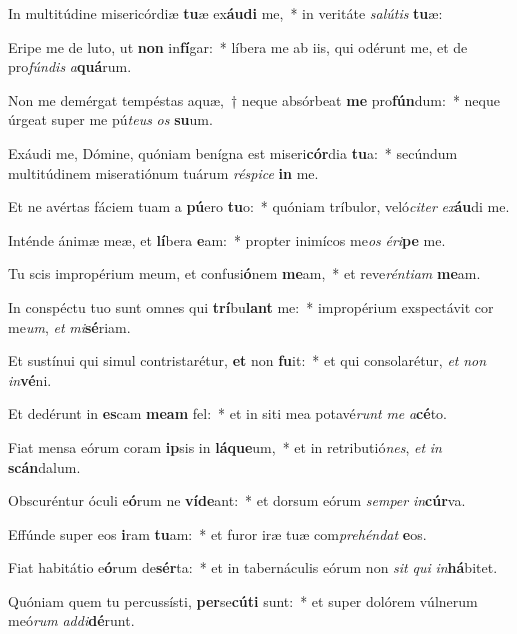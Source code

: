 \item In multitúdine misericórdiæ \textbf{tu}æ ex\textbf{áu}\textbf{di} me,~* in veritáte \textit{sa}\textit{lú}\textit{tis} \textbf{tu}æ:
\item Eripe me de luto, ut \textbf{non} in\textbf{fí}gar:~* líbera me ab iis, qui odérunt me, et de pro\textit{fún}\textit{dis} \textit{a}\textbf{quá}rum.
\item Non me demérgat tempéstas aquæ,~† neque absórbeat \textbf{me} pro\textbf{fún}dum:~* neque úrgeat super me pú\textit{te}\textit{us} \textit{os} \textbf{su}um.
\item Exáudi me, Dómine, quóniam benígna est miseri\textbf{cór}dia \textbf{tu}a:~* secúndum multitúdinem miseratiónum tuárum \textit{ré}\textit{spi}\textit{ce} \textbf{in} me.
\item Et ne avértas fáciem tuam a \textbf{pú}ero \textbf{tu}o:~* quóniam tríbulor, veló\textit{ci}\textit{ter} \textit{ex}\textbf{áu}di me.
\item Inténde ánimæ meæ, et \textbf{lí}bera \textbf{e}am:~* propter inimícos me\textit{os} \textit{é}\textit{ri}\textbf{pe} me.
\item Tu scis impropérium meum, et confusi\textbf{ó}nem \textbf{me}am,~* et reve\textit{rén}\textit{ti}\textit{am} \textbf{me}am.
\item In conspéctu tuo sunt omnes qui \textbf{trí}bu\textbf{lant} me:~* impropérium exspectávit cor me\textit{um}, \textit{et} \textit{mi}\textbf{sé}riam.
\item Et sustínui qui simul contristarétur, \textbf{et} non \textbf{fu}it:~* et qui consolarétur, \textit{et} \textit{non} \textit{in}\textbf{vé}ni.
\item Et dedérunt in \textbf{es}cam \textbf{me}\textbf{am} fel:~* et in siti mea potavé\textit{runt} \textit{me} \textit{a}\textbf{cé}to.
\item Fiat mensa eórum coram \textbf{ip}sis in \textbf{lá}\textbf{que}um,~* et in retributió\textit{nes}, \textit{et} \textit{in} \textbf{scán}dalum.
\item Obscuréntur óculi e\textbf{ó}rum ne \textbf{ví}\textbf{de}ant:~* et dorsum eórum \textit{sem}\textit{per} \textit{in}\textbf{cúr}va.
\item Effúnde super eos \textbf{i}ram \textbf{tu}am:~* et furor iræ tuæ com\textit{pre}\textit{hén}\textit{dat} \textbf{e}os.
\item Fiat habitátio e\textbf{ó}rum de\textbf{sér}ta:~* et in tabernáculis eórum non \textit{sit} \textit{qui} \textit{in}\textbf{há}bitet.
\item Quóniam quem tu percussísti, \textbf{per}se\textbf{cú}\textbf{ti} sunt:~* et super dolórem vúlnerum meó\textit{rum} \textit{ad}\textit{di}\textbf{dé}runt.
